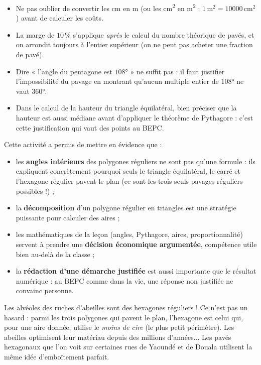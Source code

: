 \documentclass[11pt]{article}
\newcounter{popsec}
\newcounter{popsub}
\newcommand{\courssub}[1]{%
  \stepcounter{popsub}%
  \par\vspace{9pt}\noindent{\popxbold\fontsize{11.5}{13}\selectfont\color{popink}{\color{poporange}\thepopsec.\thepopsub}\hspace{6pt}#1}\par\nopagebreak\vspace{4pt}
}
\begin{document}
\begin{attention}
\begin{itemize}
\item Ne pas oublier de convertir les cm en m (ou les cm\textsuperscript{2} en m\textsuperscript{2} : $1\,\text{m}^2 = \num{10000}\,\text{cm}^2$) avant de calculer les coûts.
\item La marge de $10\,\%$ s'applique \emph{après} le calcul du nombre théorique de pavés, et on arrondit toujours à l'entier supérieur (on ne peut pas acheter une fraction de pavé).
\item Dire « l'angle du pentagone est $108°$ » ne suffit pas : il faut justifier l'impossibilité du pavage en montrant qu'aucun multiple entier de $108°$ ne vaut $360°$.
\item Dans le calcul de la hauteur du triangle équilatéral, bien préciser que la hauteur est aussi médiane avant d'appliquer le théorème de Pythagore : c'est cette justification qui vaut des points au BEPC.
\end{itemize}
\end{attention}

\courssub{Bilan de l'activité}

Cette activité a permis de mettre en évidence que :

\begin{itemize}
\item les \textbf{angles intérieurs} des polygones réguliers ne sont pas qu'une formule : ils expliquent concrètement pourquoi seuls le triangle équilatéral, le carré et l'hexagone régulier pavent le plan (ce sont les trois seuls pavages réguliers possibles !) ;
\item la \textbf{décomposition} d'un polygone régulier en triangles est une stratégie puissante pour calculer des aires ;
\item les mathématiques de la leçon (angles, Pythagore, aires, proportionnalité) servent à prendre une \textbf{décision économique argumentée}, compétence utile bien au-delà de la classe ;
\item la \textbf{rédaction d'une démarche justifiée} est aussi importante que le résultat numérique : au BEPC comme dans la vie, une réponse non justifiée ne convainc personne.
\end{itemize}

\begin{savaistu}
Les alvéoles des ruches d'abeilles sont des hexagones réguliers ! Ce n'est pas un hasard : parmi les trois polygones qui pavent le plan, l'hexagone est celui qui, pour une aire donnée, utilise le \emph{moins de cire} (le plus petit périmètre). Les abeilles optimisent leur matériau depuis des millions d'années... Les pavés hexagonaux que l'on voit sur certaines rues de Yaoundé et de Douala utilisent la même idée d'emboîtement parfait.
\end{savaistu}
\end{document}
